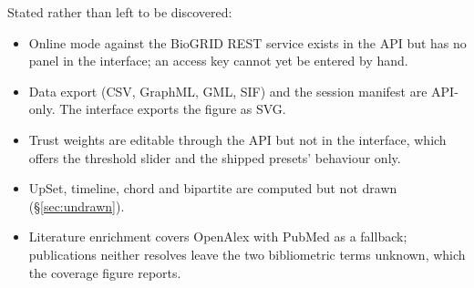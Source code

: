 \documentclass[11pt,a4paper]{article}
\begin{document}
Stated rather than left to be discovered:

\begin{itemize}
  \item Online mode against the BioGRID REST service exists in the API but has no
        panel in the interface; an access key cannot yet be entered by hand.
  \item Data export (CSV, GraphML, GML, SIF) and the session manifest are API-only. The
        interface exports the figure as SVG.
  \item Trust weights are editable through the API but not in the interface, which
        offers the threshold slider and the shipped presets' behaviour only.
  \item UpSet, timeline, chord and bipartite are computed but not drawn
        (\S\ref{sec:undrawn}).
  \item Literature enrichment covers OpenAlex with PubMed as a fallback; publications
        neither resolves leave the two bibliometric terms unknown, which the coverage
        figure reports.
\end{itemize}
\end{document}
